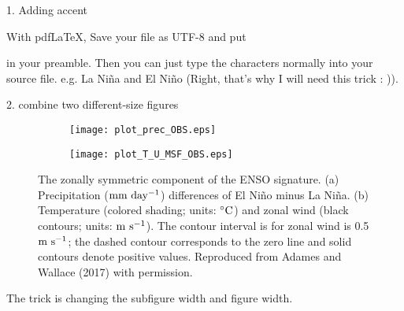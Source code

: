 1. Adding accent

With pdfLaTeX, Save your file as UTF-8 and put
\usepackage[utf8]{inputenc}
\usepackage[T1]{fontenc}
in your preamble.
Then you can just type the characters normally into your source file.
e.g. La Ni\~na and El Ni\~no (Right, that's why I will need this trick : )).

2. combine two different-size figures
\begin{figure}
\begin{subfigure}{0.945\textwidth}
\texttt{[image: plot\_prec\_OBS.eps]} 
\end{subfigure}
\begin{subfigure}{0.9\textwidth}
\texttt{[image: plot\_T\_U\_MSF\_OBS.eps]}
\end{subfigure}
\caption{The zonally symmetric component of the ENSO signature. (a) Precipitation ($\rm{mm~day^{-1}}$) differences of El Ni\~no minus La Ni\~na. (b) Temperature (colored shading; units: $\rm{^{\circ} C}$) and zonal wind (black contours; units: $\rm{m~s^{-1}}$). The contour interval is for zonal wind is 0.5 $\rm{m~s^{-1}}$; the dashed contour corresponds to the zero line and solid contours denote positive values. Reproduced from Adames and Wallace (2017) with permission.}
 \end{figure}
The trick is changing the subfigure width and figure width.
